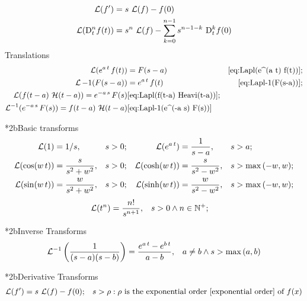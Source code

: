 \documentclass["AM3C-Slides_annotations.tex"]{subfiles}
\begin{document}
\begin{sectionBox}
\begin{sectionBox}
\begin{align*}
      \Lapl(f')
      &=  s\,\Lapl(f) - f(0)
      \\
      \Lapl(\mdif[n]{t}f(t))
      &= s^n\,\Lapl(f)
      - \sum_{k=0}^{n-1}{
        s^{n-1-k}\,\mdif[k]{t}{f}(0)
      }
    \end{align*}
    Translations
    \begin{align*}
      \operatorname{\mathcal{L}}(e^{a\,t}\,f(t)) &= F(s-a)
      & \eqref{eq:Lapl(e^(a t) f(t))}
      ; \\
      \operatorname{\mathcal{L}}-1(F(s-a)) &= e^{a\,t}\,f(t)
      & \eqref{eq:Lapl-1(F(s-a))}
      ;\\
      \operatorname{\mathcal{L}}(f(t-a)\,\operatorname{\mathcal{H}}(t-a)) = e^{-a\,s}\,F(s)
      & \eqref{eq:Lapl(f(t-a) Heavi(t-a))}
      ; \\
      \operatorname{\mathcal{L}}^{-1}(e^{-a\,s}\,F(s)) = f(t-a)\,\operatorname{\mathcal{H}}(t-a)
      & \eqref{eq:Lapl-1(e^(-a s) F(s))}
    \end{align*}
  \end{sectionBox}

  \begin{sectionBox}*2b{Basic transforms} %
    \begin{align*}
      \operatorname{\mathcal{L}}(1)           & = 1/s ,                 & s & > 0;             &
      \operatorname{\mathcal{L}}(e^{a\,t})    & = \frac{1}{s-a} ,       & s & > a;            \\
      \operatorname{\mathcal{L}}(\cos(w\,t))  & = \frac{s}{s^2+w^2} ,   & s & > 0;             &
      \operatorname{\mathcal{L}}(\cosh(w\,t)) & = \frac{s}{s^2-w^2} ,   & s & > \max{(-w,w)}; \\
      \operatorname{\mathcal{L}}(\sin(w\,t))  & = \frac{w}{s^2+w^2} ,   & s & > 0;             &
      \operatorname{\mathcal{L}}(\sinh(w\,t)) & = \frac{w}{s^2-w^2} ,   & s & > \max{(-w,w)}; \\
    \end{align*}
    \begin{align*}
      \operatorname{\mathcal{L}}(t^n)         & = \frac{n!}{{s^{n+1}}}, & s & >0\land n\in\mathbb{N}^+;
    \end{align*}
  \end{sectionBox}

  \begin{sectionBox}*2b{Inverse Transforms} %
    \begin{align*}
      \operatorname{\mathcal{L}}^{-1}{\left(\frac{1}{(s-a)(s-b)}\right)} &= \frac{e^{a\,t}-e^{b\,t}}{a-b}
      ,& a \neq b \land s> \max{(a,b)}
    \end{align*}
  \end{sectionBox}

  \begin{sectionBox}*2b{Derivative Transforms} %
    \begin{align*}
      \operatorname{\mathcal{L}}(f') &= s\,\operatorname{\mathcal{L}}(f) - f(0)
      ; & s>\rho:\rho\text{ is the exponential order \ref{exponential order} of } f(x)
    \end{align*}
  \end{sectionBox}
\end{sectionBox}
\end{document}
